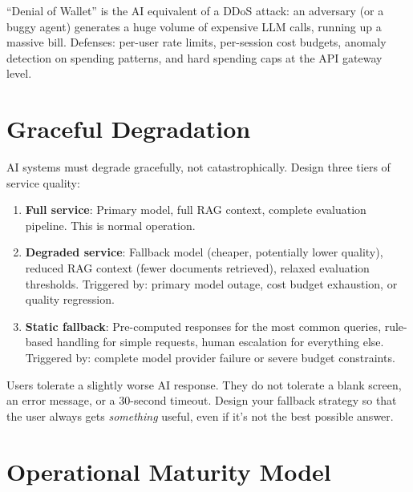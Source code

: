 \begin{cautionbox}
``Denial of Wallet'' is the AI equivalent of a DDoS attack: an adversary (or a buggy agent) generates a huge volume of expensive LLM calls, running up a massive bill. Defenses: per-user rate limits, per-session cost budgets, anomaly detection on spending patterns, and hard spending caps at the API gateway level.
\end{cautionbox}


\section{Graceful Degradation}

AI systems must degrade gracefully, not catastrophically. Design three tiers of service quality:

\begin{enumerate}[leftmargin=*]
    \item \textbf{Full service}: Primary model, full RAG context, complete evaluation pipeline. This is normal operation.
    \item \textbf{Degraded service}: Fallback model (cheaper, potentially lower quality), reduced RAG context (fewer documents retrieved), relaxed evaluation thresholds. Triggered by: primary model outage, cost budget exhaustion, or quality regression.
    \item \textbf{Static fallback}: Pre-computed responses for the most common queries, rule-based handling for simple requests, human escalation for everything else. Triggered by: complete model provider failure or severe budget constraints.
\end{enumerate}

\begin{keytakeaway}
Users tolerate a slightly worse AI response. They do not tolerate a blank screen, an error message, or a 30-second timeout. Design your fallback strategy so that the user always gets \emph{something} useful, even if it's not the best possible answer.
\end{keytakeaway}


\section{Operational Maturity Model}

